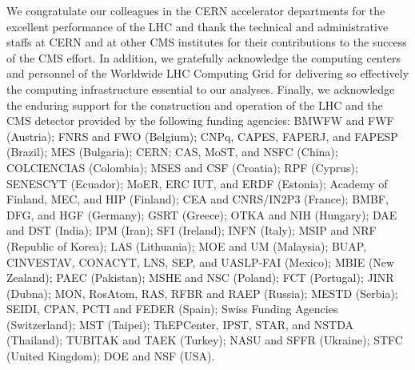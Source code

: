 \begin{acknowledgments}
We congratulate our colleagues in the CERN accelerator departments for the excellent performance of the LHC and thank the technical and administrative staffs at CERN and at other CMS institutes for their contributions to the success of the CMS effort. In addition, we gratefully acknowledge the computing centers and personnel of the Worldwide LHC Computing Grid for delivering so effectively the computing infrastructure essential to our analyses. Finally, we acknowledge the enduring support for the construction and operation of the LHC and the CMS detector provided by the following funding agencies: BMWFW and FWF (Austria); FNRS and FWO (Belgium); CNPq, CAPES, FAPERJ, and FAPESP (Brazil); MES (Bulgaria); CERN; CAS, MoST, and NSFC (China); COLCIENCIAS (Colombia); MSES and CSF (Croatia); RPF (Cyprus); SENESCYT (Ecuador); MoER, ERC IUT, and ERDF (Estonia); Academy of Finland, MEC, and HIP (Finland); CEA and CNRS/IN2P3 (France); BMBF, DFG, and HGF (Germany); GSRT (Greece); OTKA and NIH (Hungary); DAE and DST (India); IPM (Iran); SFI (Ireland); INFN (Italy); MSIP and NRF (Republic of Korea); LAS (Lithuania); MOE and UM (Malaysia); BUAP, CINVESTAV, CONACYT, LNS, SEP, and UASLP-FAI (Mexico); MBIE (New Zealand); PAEC (Pakistan); MSHE and NSC (Poland); FCT (Portugal); JINR (Dubna); MON, RosAtom, RAS, RFBR and RAEP (Russia); MESTD (Serbia); SEIDI, CPAN, PCTI and FEDER (Spain); Swiss Funding Agencies (Switzerland); MST (Taipei); ThEPCenter, IPST, STAR, and NSTDA (Thailand); TUBITAK and TAEK (Turkey); NASU and SFFR (Ukraine); STFC (United Kingdom); DOE and NSF (USA).
\end{acknowledgments}





